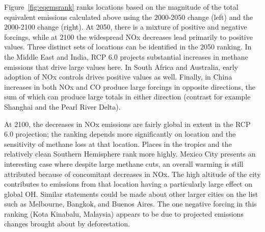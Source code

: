 Figure~\ref{fig:eqemsrank} ranks locations based on the magnitude of the total equivalent emissions calculated above using the 2000-2050 change (left) and the 2000-2100 change (right). At 2050, there is a mixture of positive and negative forcings, while at 2100 the widespread NOx decreases lead primarily to positive values. Three distinct sets of locations can be identified in the 2050 ranking. In the Middle East and India, RCP 6.0 projects substantial increases in methane emissions that drive large values here. In South Africa and Australia, early adoption of NOx controls drives positive values as well. Finally, in China increases in both NOx and CO produce large forcings in opposite directions, the sum of which can produce large totals in either direction (contrast for example Shanghai and the Pearl River Delta).

At 2100, the decreases in NOx emissions are fairly global in extent in the RCP 6.0 projection; the ranking depends more significantly on location and the sensitivity of methane loss at that location. Places in the tropics and the relatively clean Southern Hemisphere rank more highly. Mexico City presents an interesting case where despite large methane cuts, an overall warming is still attributed because of concomitant decreases in NOx. The high altitude of the city contributes to emissions from that location having a particularly large effect on global OH. Similar statements could be made about other larger cities on the list such as Melbourne, Bangkok, and Buenos Aires. The one negative forcing in this ranking (Kota Kinabalu, Malaysia) appears to be due to projected emissions changes brought about by deforestation.